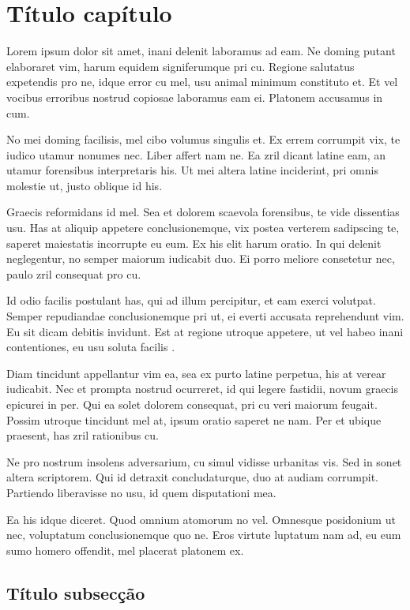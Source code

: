% 
\section{Título capítulo}
Lorem ipsum dolor sit amet, inani delenit laboramus ad eam. Ne doming putant elaboraret vim, harum equidem signiferumque pri cu. Regione salutatus expetendis pro ne, idque error cu mel, usu animal minimum constituto et. Et vel vocibus erroribus \cite{ahmed2015scientists, HOWELL20112656} nostrud copiosae laboramus eam ei. Platonem accusamus in cum.

No mei doming facilisis, mel cibo volumus singulis et. Ex errem corrumpit vix, te iudico utamur nonumes nec. Liber affert nam ne. Ea zril dicant latine eam, an utamur forensibus interpretaris his. Ut mei altera latine inciderint, pri omnis molestie ut, justo oblique id his.

Graecis reformidans id mel. Sea et dolorem scaevola forensibus, te vide dissentias usu. Has at aliquip appetere conclusionemque, vix postea verterem sadipscing te, saperet maiestatis incorrupte eu eum. Ex his elit harum oratio. In qui delenit neglegentur, no semper maiorum iudicabit duo. Ei porro meliore consetetur nec, paulo zril consequat pro cu.

Id odio facilis postulant has, qui ad illum percipitur, et eam exerci volutpat. Semper repudiandae conclusionemque pri ut, ei everti accusata reprehendunt vim. Eu sit dicam debitis invidunt. Est at regione utroque appetere, ut vel habeo inani contentiones, eu usu soluta facilis \cite{10.1007/978-3-030-18240-3_24}.

Diam tincidunt appellantur vim ea, sea ex purto latine perpetua, his at verear iudicabit. Nec et prompta nostrud ocurreret, id qui legere fastidii, novum graecis epicurei in per. Qui ea solet dolorem consequat, pri cu veri maiorum feugait. Possim utroque tincidunt mel at, ipsum oratio saperet ne nam. Per et ubique praesent, has zril rationibus cu.

Ne pro nostrum insolens adversarium, cu simul vidisse urbanitas vis. Sed in sonet altera scriptorem. Qui id detraxit concludaturque, duo at audiam corrumpit. Partiendo liberavisse no usu, id quem disputationi mea.

Ea his idque diceret. Quod omnium atomorum no vel. Omnesque posidonium ut nec, voluptatum conclusionemque quo ne. Eros virtute luptatum nam ad, eu eum sumo homero offendit, mel placerat platonem ex.

\subsection{Título subsecção}

